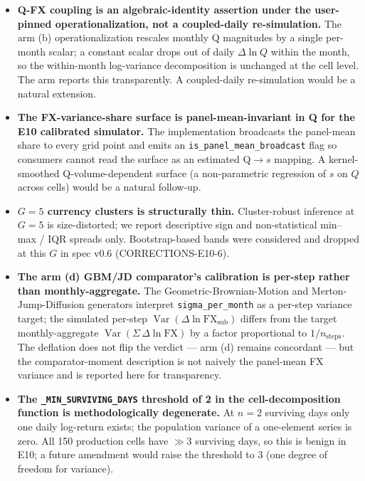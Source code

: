 \documentclass[11pt,letterpaper]{article}
\newcommand{\Var}{\operatorname{Var}}
\newcommand{\dln}{\Delta\ln}
\newcommand{\Cfx}{\mathrm{FX}}
\theoremstyle{assumption}
\begin{document}
\begin{itemize}
\item \textbf{Q-FX coupling is an algebraic-identity assertion under the
  user-pinned operationalization, not a coupled-daily re-simulation.}
  The arm (b) operationalization rescales monthly Q magnitudes by a single
  per-month scalar; a constant scalar drops out of daily $\dln Q$ within
  the month, so the within-month log-variance decomposition is unchanged
  at the cell level. The arm reports this transparently. A coupled-daily
  re-simulation would be a natural extension.

\item \textbf{The FX-variance-share surface is panel-mean-invariant in Q
  for the E10 calibrated simulator.} The implementation broadcasts the
  panel-mean share to every grid point and emits an
  \texttt{is\_panel\_mean\_broadcast} flag so consumers cannot read the
  surface as an estimated Q$\to s$ mapping. A kernel-smoothed
  Q-volume-dependent surface (a non-parametric regression of $s$ on $Q$
  across cells) would be a natural follow-up.

\item \textbf{$G = 5$ currency clusters is structurally thin.}
  Cluster-robust inference at $G = 5$ is size-distorted; we report
  descriptive sign and non-statistical min--max / IQR spreads only.
  Bootstrap-based bands were considered and dropped at this $G$ in spec
  v0.6 (CORRECTIONS-E10-6).

\item \textbf{The arm (d) GBM/JD comparator's calibration is per-step
  rather than monthly-aggregate.} The Geometric-Brownian-Motion and
  Merton-Jump-Diffusion generators interpret \texttt{sigma\_per\_month} as
  a per-step variance target; the simulated per-step
  $\Var(\dln \Cfx_{\mathrm{sub}})$ differs from the target
  monthly-aggregate $\Var(\Sigma\,\dln \Cfx)$ by a factor proportional to
  $1 / n_{\mathrm{steps}}$. The deflation does not flip the verdict ---
  arm (d) remains concordant --- but the comparator-moment description is
  not naively the panel-mean FX variance and is reported here for
  transparency.

\item \textbf{The \texttt{\_MIN\_SURVIVING\_DAYS} threshold of 2 in the
  cell-decomposition function is methodologically degenerate.} At $n = 2$
  surviving days only one daily log-return exists; the population variance
  of a one-element series is zero. All 150 production cells have
  $\gg 3$ surviving days, so this is benign in E10; a future amendment
  would raise the threshold to 3 (one degree of freedom for variance).


\end{itemize}
\end{document}
